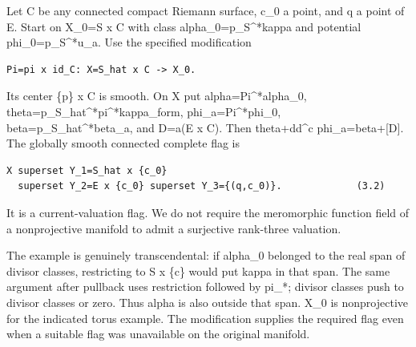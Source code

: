 \documentclass[11pt]{article}
\begin{document}
Let C be any connected compact Riemann surface, c\_\allowbreak{}0 a point, and q a point of E. Start on X\_\allowbreak{}0=\allowbreak{}S x C with class alpha\_\allowbreak{}0=\allowbreak{}p\_\allowbreak{}S\textasciicircum{}\allowbreak{}*kappa and potential phi\_\allowbreak{}0=\allowbreak{}p\_\allowbreak{}S\textasciicircum{}\allowbreak{}*u\_\allowbreak{}a. Use the specified modification

\begin{Verbatim}[breaklines=true,fontsize=\small]
Pi=pi x id_C: X=S_hat x C -> X_0.
\end{Verbatim}

Its center \{p\} x C is smooth. On X put alpha=\allowbreak{}Pi\textasciicircum{}\allowbreak{}*alpha\_\allowbreak{}0, theta=\allowbreak{}p\_\allowbreak{}S\_\allowbreak{}hat\textasciicircum{}\allowbreak{}*pi\textasciicircum{}\allowbreak{}*kappa\_\allowbreak{}form, phi\_\allowbreak{}a=\allowbreak{}Pi\textasciicircum{}\allowbreak{}*phi\_\allowbreak{}0, beta=\allowbreak{}p\_\allowbreak{}S\_\allowbreak{}hat\textasciicircum{}\allowbreak{}*beta\_\allowbreak{}a, and D=\allowbreak{}a(E x C). Then theta+dd\textasciicircum{}\allowbreak{}c phi\_\allowbreak{}a=\allowbreak{}beta+[D]. The globally smooth connected complete flag is

\begin{Verbatim}[breaklines=true,fontsize=\small]
X superset Y_1=S_hat x {c_0}
  superset Y_2=E x {c_0} superset Y_3={(q,c_0)}.             (3.2)
\end{Verbatim}

It is a current-\allowbreak{}valuation flag. We do not require the meromorphic function field of a nonprojective manifold to admit a surjective rank-\allowbreak{}three valuation.

The example is genuinely transcendental: if alpha\_\allowbreak{}0 belonged to the real span of divisor classes, restricting to S x \{c\} would put kappa in that span. The same argument after pullback uses restriction followed by pi\_\allowbreak{}*; divisor classes push to divisor classes or zero. Thus alpha is also outside that span. X\_\allowbreak{}0 is nonprojective for the indicated torus example. The modification supplies the required flag even when a suitable flag was unavailable on the original manifold.
\end{document}
